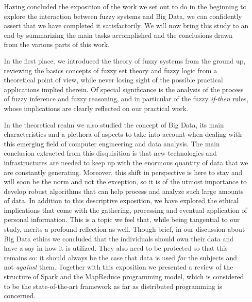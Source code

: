 %
%
%

Having concluded the exposition of the work we set out to do in the beginning to explore the interaction between fuzzy systems and Big Data, we can confidently assert that we have completed it satisfactorily. We will now bring this study to an end by summarizing the main tasks accomplished and the conclusions drawn from the various parts of this work.

In the first place, we introduced the theory of fuzzy systems from the ground up, reviewing the basics concepts of fuzzy set theory and fuzzy logic from a theoretical point of view, while never losing sight of the possible practical applications implied therein. Of special significance is the analysis of the process of fuzzy inference and fuzzy reasoning, and in particular of the fuzzy \textit{if-then} rules, whose implications are clearly reflected on our practical work.

In the theoretical realm we also studied the concept of Big Data, its main characteristics and a plethora of aspects to take into account when dealing with this emerging field of computer engineering and data analysis. The main conclusion extracted from this disquisition is that new technologies and infrastructures are needed to keep up with the enormous quantity of data that we are constantly generating. Moreover, this shift in perspective is here to stay and will soon be the norm and not the exception, so it is of the utmost importance to develop robust algorithms that can help process and analyze such large amounts of data. In addition to this descriptive exposition, we have explored the ethical implications that come with the gathering, processing and eventual application of personal information. This is a topic we feel that, while being tangential to our study, merits a profound reflection as well. Though brief, in our discussion about Big Data ethics we concluded that the individuals should own their data and have a say in how it is utilized. They also need to be protected so that this remains so: it should always be the case that data is used \textit{for} the subjects and not \textit{against} them. Together with this exposition we presented a review of the structure of Spark and the MapReduce programming model, which is considered to be the state-of-the-art framework as far as distributed programming is concerned.

